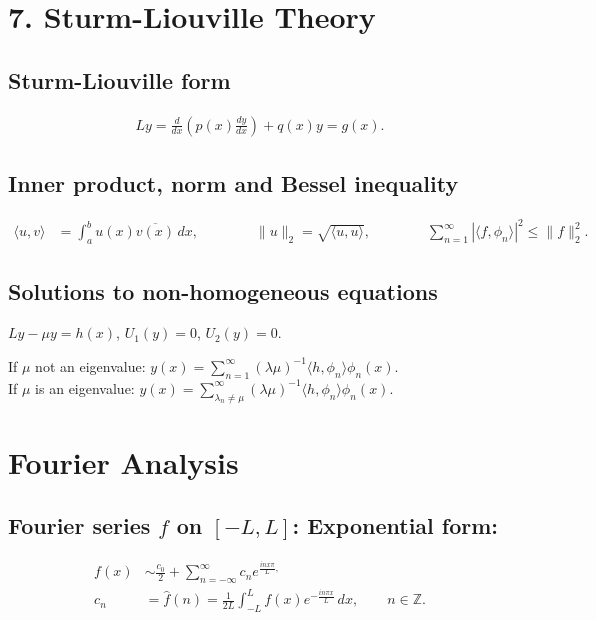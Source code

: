 \section*{7. Sturm-Liouville Theory}

\subsection*{Sturm-Liouville form}
\begin{align*}
 Ly = \frac{d}{dx} \left(p(x)\frac{dy}{dx}\right) + q(x)y = g(x).
\end{align*}

\subsection*{Inner product, norm and Bessel inequality}
\begin{align*}
 \langle u,v\rangle &= \int_a^b u(x)\overline {v(x)}\, dx, 
 \qquad \qquad  \|u\|_2 = \sqrt{\langle u,u\rangle },
 \qquad \qquad \sum_{n=1}^{\infty} |\langle f, \phi_n\rangle|^2 \leq 
 \|f\|_2^2.
\end{align*}

\subsection*{Solutions to non-homogeneous equations}
\begin{center}$Ly-\mu y = h(x)$, $U_1(y)=0$, $U_2(y)=0$. \end{center}
If $\mu$ not an eigenvalue: $y(x) = \sum_{n=1}^\infty (\lambda \mu)^{-1}\langle h,\phi_n 
\rangle \phi_n(x)$.\\
If $\mu$ is an eigenvalue: $y(x) = \sum_{\lambda_n\neq \mu}^\infty (\lambda \mu)^{-1}\langle h,\phi_n 
\rangle \phi_n(x)$.

\section*{Fourier Analysis}

 \subsection*{Fourier series $f$ on $[-L,L]$: Exponential form:}
 
 \begin{align*}
  f(x) &\sim \frac{c_0}2 + \sum_{n=-\infty}^\infty c_n e^{\frac{inx\pi}{L},}\\
  c_n &= \hat f(n) = \frac 1{2L} \int_{-L}^L f(x) e^{-\frac{in\pi x}L}\, dx, \qquad n\in \mathbb Z.
 \end{align*}


